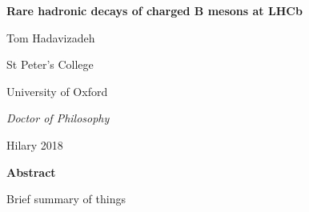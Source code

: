 

\begin{alwayssingle} 
 \thispagestyle{empty}
 \vspace*{-1in}
 \begin{center}
   { \Large {\bfseries {Rare hadronic decays of charged B mesons at LHCb}} \par}
   {{\large \vspace*{1ex} Tom Hadavizadeh} \par}
   {\large \vspace*{1ex}
   {{St Peter's College} \par}
   {University of Oxford \par}
   \vspace*{1ex}
   {{\it \submittedtext} \par}
   {\it {Doctor of Philosophy} \par}
    \vspace*{2ex}
    {Hilary 2018}\par}
    \vspace*{1.5cm}
    {\Large \bfseries  Abstract}
  \end{center}

  Brief summary of things
\end{alwayssingle}